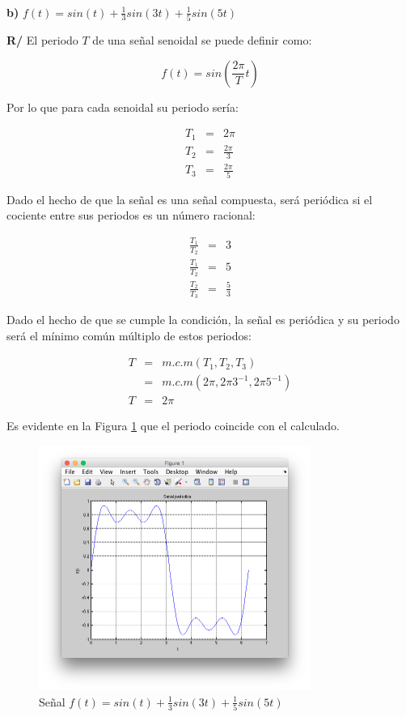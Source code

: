 \documentclass[twocolumn]{article}
\begin{document}
$\,$

\textbf{b)} $f(t) = sin(t) + \frac{1}{3}sin(3t) + \frac{1}{5}sin(5t)$

\textbf{R/} El periodo $T$ de una señal senoidal se puede definir como:

$$f(t) = sin\left(\frac{2\pi}{T}t\right)$$

Por lo que para cada senoidal su periodo sería:

\begin{eqnarray*}
T_1 &=& 2\pi\\
T_2 &=& \frac{2\pi}{3}\\
T_3 &=& \frac{2\pi}{5}
\end{eqnarray*}

Dado el hecho de que la señal es una señal compuesta, será periódica si el cociente entre sus periodos es un número racional:

\begin{eqnarray*}
\frac{T_1}{T_2} &=& 3\\
\frac{T_1}{T_2} &=& 5\\
\frac{T_2}{T_3} &=& \frac{5}{3}
\end{eqnarray*}

Dado el hecho de que se cumple la condición, la señal es periódica y su periodo será el mínimo común múltiplo de estos periodos:

\begin{eqnarray*}
T &=& m.c.m(T_1,T_2,T_3)\\
&=& m.c.m(2 \pi,2\pi3^{-1},2\pi5^{-1})\\
T &=& 2\pi
\end{eqnarray*}

Es evidente en la Figura \ref{fig_5b} que el periodo coincide con el calculado.

\begin{figure}[!t]
\centering
\includegraphics[width=3.5in]{imgs/5b.png}
\caption{Señal $f(t) = sin(t) + \frac{1}{3}sin(3t) + \frac{1}{5}sin(5t)$}
\label{fig_5b}
\end{figure}
\end{document}
